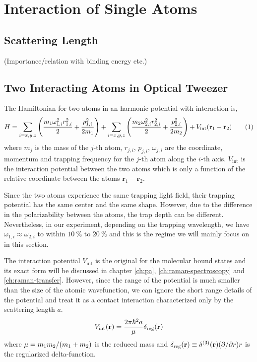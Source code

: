 
\chapter{Interaction of Single Atoms}
\label{ch:interaction-shift}

\section{Scattering Length}
\todo{}
(Importance/relation with binding energy etc.)

\section{Two Interacting Atoms in Optical Tweezer}

The Hamiltonian for two atoms in an harmonic potential with interaction is,
\[
  H=\sum_{i=x,y,z}\paren{\frac{m_{1}\omega_{1,i}^2r_{1,i}^2}{2}+\frac{p_{1,i}^2}{2m_{1}}}+\sum_{i=x,y,z}\paren{\frac{m_{2}\omega_{2,i}^2r_{2,i}^2}{2}+\frac{p_{2,i}^2}{2m_{2}}}+V_{\mathrm{int}}\paren{\mathbf{r}_1-\mathbf{r}_2}\numberthis{eq:interaction-shift:orig-hamiltonian}
\]
where $m_j$ is the mass of the $j$-th atom,
$r_{j,i}$, $p_{j,i}$, $\omega_{j,i}$ are the coordinate, momentum and trapping frequency
for the $j$-th atom along the $i$-th axis.
$V_{\mathrm{int}}$ is the interaction potential between the two atoms which is only a function
of the relative coordinate between the atoms $\mathbf{r}_1-\mathbf{r}_2$.

Since the two atoms experience the same trapping light field,
their trapping potential has the same center and the same shape.
However, due to the difference in the polarizability between the atoms,
the trap depth can be different.
Nevertheless, in our experiment, depending on the trapping wavelength,
we have $\omega_{1,i}\approx\omega_{2,i}$ to within $10~\%$ to $20~\%$
and this is the regime we will mainly focus on in this section.

The interaction potential $V_{\mathrm{int}}$ is the original for
the molecular bound states and its exact form will be discussed in chapter \ref{ch:pa},
\ref{ch:raman-spectroscopy} and \ref{ch:raman-transfer}.
However, since the range of the potential is much smaller than
the size of the atomic wavefunction, we can ignore the short range details of the potential
and treat it as a contact interaction characterized only by the scattering length $a$.
\[
  V_{\mathrm{int}}{\left({\mathbf{r}}\right)}=\frac{2\pi\hbar^2a}{\mu}\delta_{\mathrm{reg}}{\left({\mathbf{r}}\right)}
\]
where $\mu = m_1m_2/{\left({m_1+m_2}\right)}$ is the reduced mass and
$\delta_{\mathrm{reg}}{\left({\mathbf{r}}\right)}\equiv\delta^{(3)}{\left({\mathbf{r}}\right)}{\left({\partial/\partial r}\right)}r$
is the regularized delta-function.

